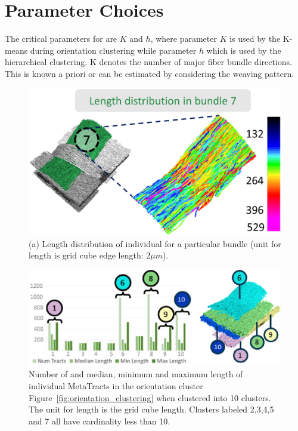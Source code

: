 \section{Parameter Choices}\label{sec:param_choices}
The critical parameters for \mt are $K$ and $h$, where parameter $K$ is used by the K-means during orientation clustering while parameter $h$ which is used by the hierarchical clustering.
K denotes the number of major fiber bundle directions. This is known a priori or can be estimated by considering the weaving pattern. 
\begin{figure}[htb]
	\centering
	\includegraphics[width=0.8\linewidth]{images/lengthDistribution.eps}
	\caption{(a) Length distribution of individual \mt for a particular bundle (unit for length is grid cube edge length:  $2\mu m$).}
	\label{fig:length_distribution}
\end{figure}
\begin{figure}[htb]
	\centering
	\includegraphics[width=\linewidth,  trim = 0mm 0mm 0mm 00mm, clip]{images/figure9_AMA.eps}
	\caption{Number of \mt and median, minimum and maximum length of individual MetaTracts in the orientation cluster Figure~\ref{fig:orientation_clustering} when clustered into 10 clusters. The unit for length is the grid cube length. Clusters labeled 2,3,4,5 and 7 all have cardinality less than 10. }
	\label{fig:len_dist_crop16} 
\end{figure}
